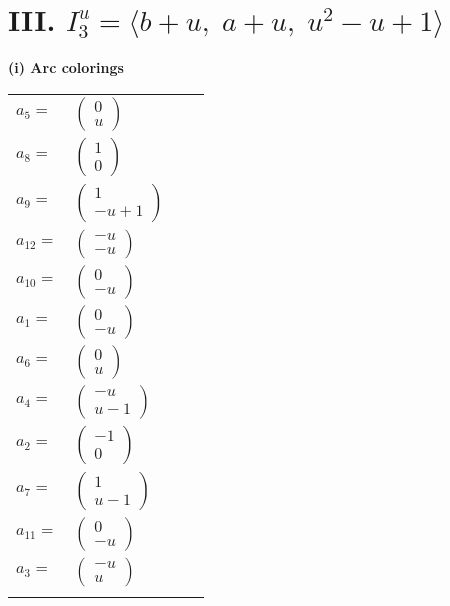 \documentclass[1p]{elsarticle_modified}
\theoremstyle{definition}
\begin{document}
\centering \section*{III. $I^u_{3}= \langle b+u,\;a+u,\;u^2- u+1 \rangle$}
\flushleft \textbf{(i) Arc colorings}\\
\begin{tabular}{m{7pt} m{180pt} m{7pt} m{180pt} }
\flushright $a_{5}=$&$\begin{pmatrix}0\\u\end{pmatrix}$ \\
\flushright $a_{8}=$&$\begin{pmatrix}1\\0\end{pmatrix}$ \\
\flushright $a_{9}=$&$\begin{pmatrix}1\\- u+1\end{pmatrix}$ \\
\flushright $a_{12}=$&$\begin{pmatrix}- u\\- u\end{pmatrix}$ \\
\flushright $a_{10}=$&$\begin{pmatrix}0\\- u\end{pmatrix}$ \\
\flushright $a_{1}=$&$\begin{pmatrix}0\\- u\end{pmatrix}$ \\
\flushright $a_{6}=$&$\begin{pmatrix}0\\u\end{pmatrix}$ \\
\flushright $a_{4}=$&$\begin{pmatrix}- u\\u-1\end{pmatrix}$ \\
\flushright $a_{2}=$&$\begin{pmatrix}-1\\0\end{pmatrix}$ \\
\flushright $a_{7}=$&$\begin{pmatrix}1\\u-1\end{pmatrix}$ \\
\flushright $a_{11}=$&$\begin{pmatrix}0\\- u\end{pmatrix}$ \\
\flushright $a_{3}=$&$\begin{pmatrix}- u\\u\end{pmatrix}$\\&\end{tabular}
\end{document}
